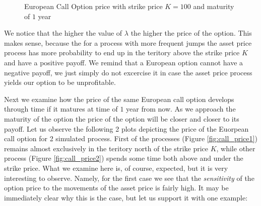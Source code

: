 \documentclass[times, utf8, diplomski]{fer}
\begin{document}
\begin{figure}[ht]
\centering

\caption{European Call Option price with strike price $K=100$ and maturity of $1$ year}
\label{fig:call_prices_different_lambdas}
\end{figure}

\noindent We notice that the higher the value of $\lambda$ the higher the price of the option. This makes sense, because the for a process with more frequent jumps the asset price process has more probability to end up in the teritory above the strike price $K$ and have a positive payoff. We remind that a European option cannot have a negative payoff, we just simply do not excercise it in case the asset price process yields our option to be unprofitable. 

\noindent Next we examine how the price of the same European call option develops through time if it matures at time of $1$ year from now. As we approach the maturity of the option the price of the option will be closer and closer to its payoff. Let us observe the following 2 plots depicting the price of the Euorpean call option for 2 simulated process. First of the processes (Figure \ref{fig:call_price1}) remains almost exclusively in the teritory north of the strike price $K$, while other process (Figure \ref{fig:call_price2}) spends some time both above and under the strike price. What we examine here is, of course, expected, but it is very interesting to observe. Namely, for the first case we see that the \textit{sensitivity} of the option price to the movements of the asset price is fairly high. It may be immediately clear why this is the case, but let us support it with one example:
\end{document}
